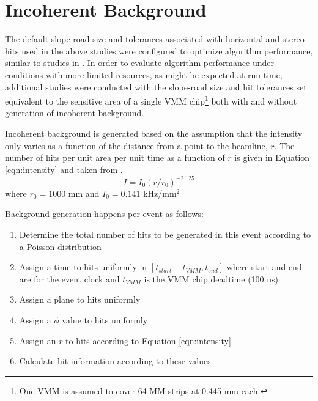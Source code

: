 
\clearpage
\section{Incoherent Background}
The default slope-road size and tolerances associated with horizontal and stereo hits used in the above studies were configured to optimize algorithm performance, similar to studies in \cite{blcnote}.  In order to evaluate algorithm performance under conditions with more limited resources, as might be expected at run-time, additional studies were conducted with the slope-road size and hit tolerances set equivalent to the sensitive area of a single VMM chip\footnote{One VMM is assumed to cover 64 MM strips at 0.445 mm each.} both with and without generation of incoherent background.  

Incoherent background is generated based on the assumption that the intensity only varies as a function of the distance from a point to the beamline, $r$.  The number of hits per unit area per unit time as a function of $r$ is given in Equation \ref{eqn:intensity} and taken from \cite{blcnote}.
\begin{equation}
\label{eqn:intensity}
I=I_0\left(r/r_0\right)^{-2.125}
\end{equation}
where $r_0=1000$ mm and $I_0=0.141$ kHz/mm$^2$

Background generation happens per event as follows:
\begin{enumerate}
\item Determine the total number of hits to be generated in this event according to a Poisson distribution
\item Assign a time to hits uniformly in $\left[t_{start}-t_{VMM},t_{end}\right]$ where start and end are for the event clock and $t_{VMM}$ is the VMM chip deadtime (100 ns)
\item Assign a plane to hits uniformly
\item Assign a $\phi$ value to hits uniformly
\item Assign an $r$ to hits according to Equation \ref{eqn:intensity}
\item Calculate hit information according to these values.
\end{enumerate}

